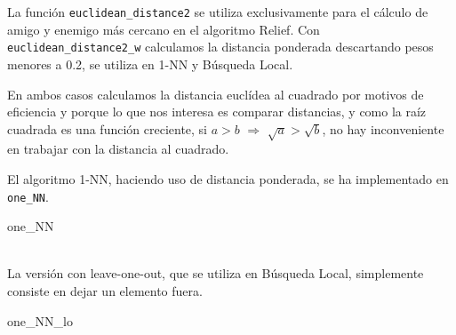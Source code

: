 \documentclass[11pt,a4paper]{article}
\theoremstyle{definition}
\begin{document}
	La función \texttt{euclidean\_distance2}  se utiliza exclusivamente para el cálculo de amigo y enemigo más cercano en el algoritmo Relief. Con \texttt{euclidean\_distance2\_w} calculamos la distancia ponderada descartando pesos menores a 0.2, se utiliza en 1-NN y Búsqueda Local.
	
	En ambos casos calculamos la distancia euclídea al cuadrado por motivos de eficiencia y porque lo que nos interesa es comparar distancias, y como la raíz cuadrada es una función creciente, si $a>b$ $\Rightarrow $ $\sqrt{a}>\sqrt{b}$, no hay inconveniente en trabajar con la distancia al cuadrado.
	
	El algoritmo 1-NN, haciendo uso de distancia ponderada, se ha implementado en \texttt{one\_NN}.\\
	
	\begin{algorithm}[H]
		\caption{one\_NN}
	\end{algorithm}~\\
	
	La versión con leave-one-out, que se utiliza en Búsqueda Local, simplemente consiste en dejar un elemento fuera. \\
	
	\begin{algorithm}[H]
		\caption{one\_NN\_lo}
	\end{algorithm}
	
\end{document}
